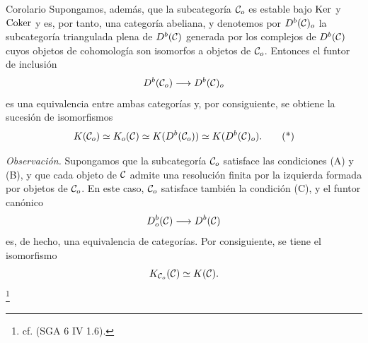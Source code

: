 \begin{statement}{Corolario}
Supongamos, además, que la subcategoría $\mathcal C_o$ es estable bajo $\operatorname{Ker}$ y $\operatorname{Coker}$ y es, por tanto, una categoría abeliana, y denotemos por $D^b(\mathcal C)_o$ la subcategoría triangulada plena de $D^b(\mathcal C)$ generada por los complejos de $D^b(\mathcal C)$ cuyos objetos de cohomología son isomorfos a objetos de $\mathcal C_o$. Entonces el funtor de inclusión
\[
D^b(\mathcal C_o)\longrightarrow D^b(\mathcal C)_o
\]
es una equivalencia entre ambas categorías y, por consiguiente, se obtiene la sucesión de isomorfismos
\[
K(\mathcal C_o)\simeq K_o(\mathcal C)\simeq K(D^b(\mathcal C_o))\simeq K(D^b(\mathcal C)_o).
\tag{*}
\]
\end{statement}

\emph{Observación.} Supongamos que la subcategoría $\mathcal C_o$ satisface las condiciones (A) y (B), y que cada objeto de $\mathcal C$ admite una resolución finita por la izquierda formada por objetos de $\mathcal C_o$. En este caso, $\mathcal C_o$ satisface también la condición (C), y el funtor canónico
\[
D_o^b(\mathcal C)\longrightarrow D^b(\mathcal C)
\]
es, de hecho, una equivalencia de categorías. Por consiguiente, se tiene el isomorfismo
\[
K_{\mathcal C_o}(\mathcal C)\simeq K(\mathcal C).
\]
\footnote{cf. (SGA 6 IV 1.6).}
